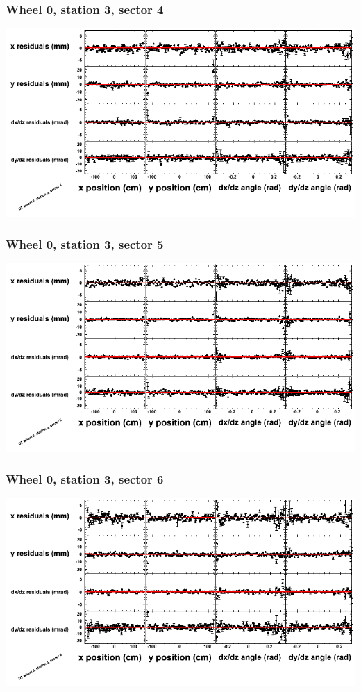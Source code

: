 \documentclass[compress]{beamer}
\begin{document}
\begin{frame}
\frametitle{Wheel 0, station 3, sector 4}
\includegraphics[width=\linewidth]{tmppoly_MBwhCst3sec04.png}
\end{frame}

\begin{frame}
\frametitle{Wheel 0, station 3, sector 5}
\includegraphics[width=\linewidth]{tmppoly_MBwhCst3sec05.png}
\end{frame}

\begin{frame}
\frametitle{Wheel 0, station 3, sector 6}
\includegraphics[width=\linewidth]{tmppoly_MBwhCst3sec06.png}
\end{frame}
\end{document}

